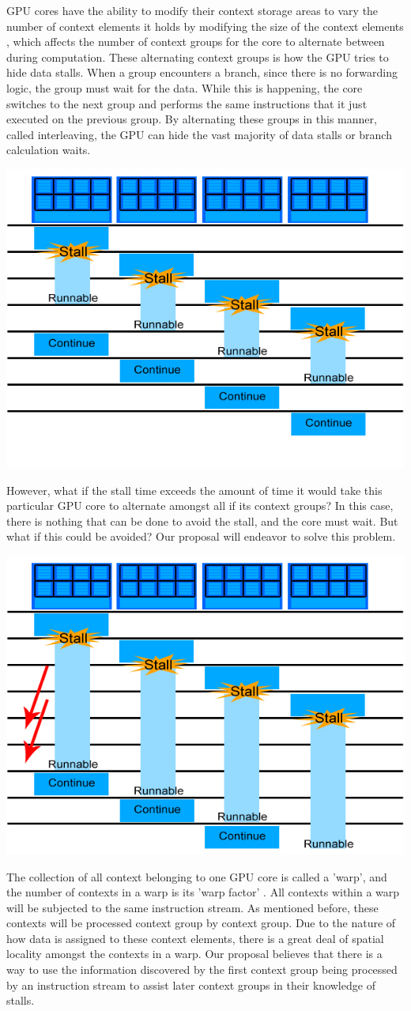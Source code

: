 \documentclass[conference]{IEEEtran}
\begin{document}
GPU cores have the ability to modify their context storage areas to vary the number of context elements it holds by modifying the size of the context elements \cite{SIG09}, which affects the number of context groups for the core to alternate between during computation.  These alternating context groups is how the GPU tries to hide data stalls.  When a group encounters a branch, since there is no forwarding logic, the group must wait for the data.  While this is happening, the core switches to the next group and performs the same instructions that it just executed on the previous group.  By alternating these groups in this manner, called interleaving, the GPU can hide the vast majority of data stalls or branch calculation waits.

\begin{center}
	\includegraphics[width=.45\textwidth]{GPU-context-interleaving.jpg}
\end{center}

However, what if the stall time exceeds the amount of time it would take this particular GPU core to alternate amongst all if its context groups?  In this case, there is nothing that can be done to avoid the stall, and the core must wait.  But what if this could be avoided?  Our proposal will endeavor to solve this problem.
\begin{center}
	\includegraphics[width=.45\textwidth]{GPU-context-interleaving-2.jpg}
\end{center}

The collection of all context belonging to one GPU core is called a 'warp', and the number of contexts in a warp is  its 'warp factor' \cite{Luebke08}.  All contexts within a warp will be subjected to the same instruction stream.  As mentioned before, these contexts will be processed context group by context group.  Due to the nature of how data is assigned to these context elements, there is a great deal of spatial locality amongst the contexts in a warp.  Our proposal believes that there is a way to use the information discovered by the first context group being processed by an instruction stream to assist later context groups in their knowledge of stalls.
\end{document}
